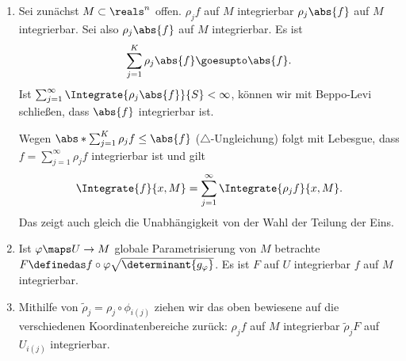 \begin{ergaenzung*}
  \begin{enumerate}[label=\rechtsklammer{\arabic*}]
    \item Sei zunächst \( M\subset \reals^n \) offen. \( \rho_j f \) auf \( M \) integrierbar \tiff \( \rho_j \abs{f} \) auf \( M \) integrierbar.
    Sei also \( \rho_j\abs{f} \) auf \( M \) integrierbar. Es ist
    \begin{equation*}
      \sum_{j=1}^{K}\rho_j \abs{f}\goesupto \abs{f}.
    \end{equation*}
    Ist \( \sum_{j=1}^{\infty}\Integrate{\rho_j \abs{f}}{S}<\infty \), können wir mit Beppo-Levi schließen, dass \( \abs{f} \) integrierbar ist.

    Wegen \( \abs*{\sum_{j=1}^{K}\rho_j f}\leq \abs{f} \) (\( \triangle \)-Ungleichung) folgt mit Lebesgue, dass \( f=\sum_{j=1}^{\infty}\rho_j f \) integrierbar ist und gilt
    \begin{equation*}
      \Integrate{f}{x,M}=\sum_{j=1}^{\infty}\Integrate{\rho_j f}{x,M}.
    \end{equation*}
    Das zeigt auch gleich die Unabhängigkeit von der Wahl der Teilung der Eins.
    \item Ist \( \varphi\maps U\to M \) globale Parametrisierung von \( M\) betrachte \( F\definedas f\circ \varphi \sqrt{\determinant{g_{\varphi}}} \). Es ist \( F \) auf \( U \) integrierbar \tiff \( f \) auf \( M \) integrierbar.
    \item Mithilfe von \( \tilde{\rho}_j=\rho_j \circ \phi_{i(j)} \) ziehen wir das oben bewiesene auf die verschiedenen Koordinatenbereiche zurück: \( \rho_j f \) auf \( M \) integrierbar \tiff \( \tilde{\rho}_j F \) auf \( U_{i(j)} \) integrierbar.
  \end{enumerate}
\end{ergaenzung*}
